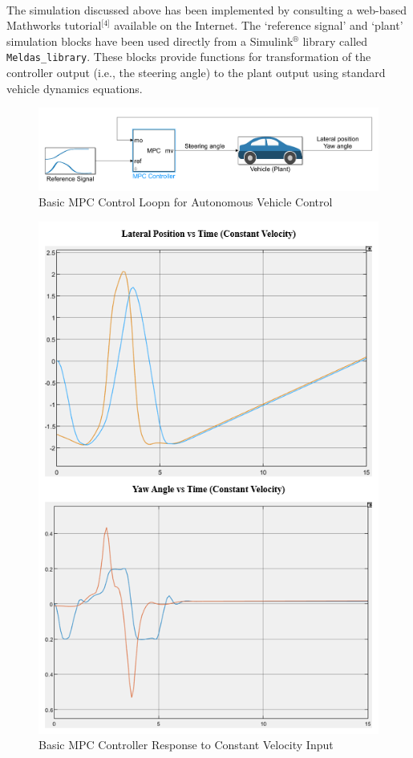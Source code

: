 \paragraph{}
The simulation discussed above has been implemented by consulting a web-based Mathworks tutorial$^{\text{[4]}}$ available on the Internet. The `reference signal' and `plant' simulation blocks have been used directly from a Simulink$^{\circledR}$ library called \texttt{Meldas\_library}. These blocks provide functions for transformation of the controller output (i.e., the steering angle) to the plant output using standard vehicle dynamics equations.

\begin{figure}[H]\label{fig4.1}
\centering \includegraphics[scale=0.4]{Images/basic_mpc_model.png}
\caption{Basic MPC Control Loopn for Autonomous Vehicle Control}
\end{figure}

\begin{figure}[H]\label{fig4.2}
\centering \includegraphics[scale=1.1]{Images/basic_mpc_constant_response.png}
\caption{Basic MPC Controller Response to Constant Velocity Input}
\end{figure}
